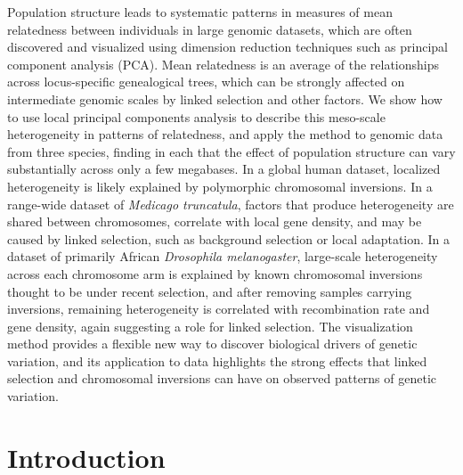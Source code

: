 \documentclass[11pt, oneside]{article}   	%
\begin{document}
Population structure leads to systematic patterns in measures of mean relatedness
between individuals in large genomic datasets,
which are often discovered and visualized using dimension reduction techniques such as principal component analysis (PCA).
Mean relatedness
is an average of the relationships across locus-specific genealogical trees,
which can be strongly affected on intermediate genomic scales by linked selection and other factors.
We show how to use local principal components analysis to describe this 
meso-scale heterogeneity in patterns of relatedness,
and apply the method to genomic data from three species,
finding in each that the effect of population structure 
can vary substantially across only a few megabases.
In a global human dataset, localized heterogeneity is likely explained by polymorphic chromosomal inversions.
In a range-wide dataset of \textit{Medicago truncatula},
factors that produce heterogeneity are shared between chromosomes,
correlate with local gene density,
and may be caused by linked selection, such as background selection or local adaptation.
In a dataset of primarily African \textit{Drosophila melanogaster}, large-scale heterogeneity across each chromosome arm
is explained by known chromosomal inversions thought to be under recent selection,
and after removing samples carrying inversions, remaining heterogeneity is correlated with recombination rate and gene density,
again suggesting a role for linked selection.
The visualization method provides a flexible new way to discover biological drivers of genetic variation,
and its application to data highlights the strong effects that linked selection and chromosomal inversions
can have on observed patterns of genetic variation.



\section{Introduction}
\end{document}
